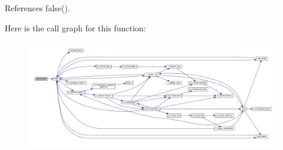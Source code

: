 References false().

Here is the call graph for this function\+:
\nopagebreak
\begin{figure}[H]
\begin{center}
\leavevmode
\includegraphics[width=350pt]{colors_8f90_a39c21619b08a3c22f19e2306efd7f766_cgraph}
\end{center}
\end{figure}
